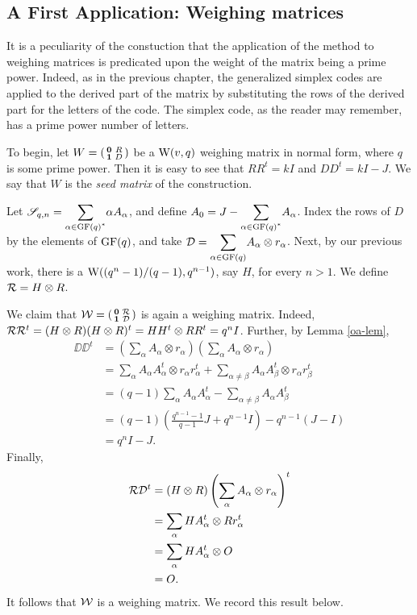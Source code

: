 \documentclass[../../../main]{subfiles}
\begin{document}
\subsection{A First Application: Weighing matrices}

It is a peculiarity of the constuction that the application of the method to weighing matrices is predicated upon the weight of the matrix being a prime power. Indeed, as in the previous chapter, the generalized simplex codes are applied to the derived part of the matrix by substituting the rows of the derived part for the letters of the code. The simplex code, as the reader may remember, has a prime power number of letters.

To begin, let $W = \left(\begin{smallmatrix} \mathbf{0} & R \\ \mathbf{1} & D \end{smallmatrix}\right)$ be a $\text{W}(v,q)$ weighing matrix in normal form, where $q$ is some prime power. Then it is easy to see that $RR^t = kI$ and $DD^t = kI-J$. We say that $W$ is the {\it seed matrix} of the construction. 

Let $\simplex_{q,n} = \ssum_{\alpha\in\gf(q)^*} \alpha A_\alpha$, and define $A_0 = J - \ssum_{\alpha\in\gf(q)^*} A_\alpha$. Index the rows of $D$ by the elements of $\text{GF}(q)$, and take $\DD = \ssum_{\alpha\in\gf(q)} A_\alpha \otimes r_\alpha$. Next, by our previous work, there is a $\text{W}((q^n-1)/(q-1),q^{n-1})$, say $H$, for every $n>1$. We define $\mathcal{R} = H \otimes R$.

We claim that $\mathcal{W} = \left(\begin{smallmatrix} \mathbf{0} & \mathcal{R} \\ \mathbf{1} & \mathcal{D} \end{smallmatrix}\right)$ is again a weighing matrix. Indeed, $\mathcal{R}\mathcal{R}^t = (H \otimes R)(H \otimes R)^t = HH^t \otimes RR^t = q^nI$. Further, by Lemma \ref{oa-lem},
\begin{align*}
\DD\DD^t &= \left( \sum_\alpha A_\alpha \otimes r_\alpha \right) \left( \sum_\alpha A_\alpha \otimes r_\alpha \right) \\
&= \sum_\alpha A_\alpha A_\alpha^t \otimes r_\alpha r_\alpha^t + \sum_{\alpha\neq\beta} A_\alpha A_\beta^t \otimes r_\alpha r_\beta^t \\
&= (q-1)\sum_\alpha A_\alpha A_\alpha^t - \sum_{\alpha\neq\beta} A_\alpha A_\beta^t \\
&= (q-1)\left( \frac{q^{n-1}-1}{q-1}J + q^{n-1}I \right) - q^{n-1}(J-I) \\
&= q^nI - J.
\end{align*}
Finally,
\begin{align*}
 \mathcal{R}\mathcal{D}^t &= (H \otimes R)\left( \sum_\alpha A_\alpha \otimes r_\alpha \right)^t \\
 &= \sum_\alpha HA_\alpha^t \otimes Rr_\alpha^t \\
 &= \sum_\alpha HA_\alpha^t \otimes O \\
 &= O.
\end{align*}
It follows that $\mathcal{W}$ is a weighing matrix. We record this result below.
\end{document}
